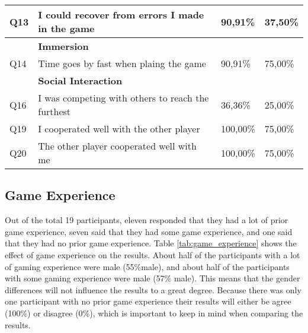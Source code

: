 \begin{table}[ht]
\begin{tabularx}{\textwidth}{|l|X|l|l|}
		Q13         & I could recover from errors I made in the game                 & 90,91\%        & 37,50\%         \\ \hline
		& \textbf{Immersion}                                             &                &                 \\ \hline
		Q14         & Time goes by fast when plaing the game                         & 90,91\%        & 75,00\%         \\ \hline
		& \textbf{Social Interaction}                                    &                &                 \\ \hline
		Q16         & I was competing with others to reach the furthest              & 36,36\%        & 25,00\%         \\ \hline
		Q19         & I cooperated well with the other player                        & 100,00\%       & 75,00\%         \\ \hline
		Q20         & The other player cooperated well with me                       & 100,00\%       & 75,00\%         \\ \hline
	\end{tabularx}
\end{table}

\subsection{Game Experience}
Out of the total 19 participants, eleven responded that they had a lot of prior game experience, seven said that they had some game experience, and one said that they had no prior game experience. Table \ref{tab:game_experience} shows the effect of game experience on the results. About half of the participants with a lot of gaming experience were male (55\%male), and about half of the participants with some gaming experience were male (57\% male). This means that the gender differences will not influence the results to a great degree. Because there was only one participant with no prior game experience their results will either be agree (100\%) or disagree (0\%), which is important to keep in mind when comparing the results. 

